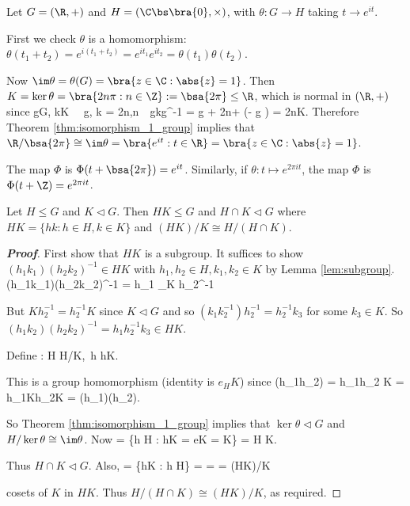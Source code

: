 \begin{example}
Let $G = (\R,+)$ and $H = (\C\bs\bra{0},\times)$, with $\theta:G\to H$ taking $t\to e^{i t}$.

First we check $\theta$ is a homomorphism: $\theta(t_1 + t_2) = e^{i(t_1+t_2)} = e^{it_1}e^{it_2} = \theta(t_1)\theta(t_2)$.

Now $\im \theta = \theta(G) = \bra{z\in \C:\abs{z}=1}$. Then $K = \ker\theta = \bra{2n\pi:n\in \Z}:= \bsa{2\pi}\leq \R$, which is normal in $(\R,+)$ since
\be
\forall g\in G, k\in K \ \ra \ g\in \R, k = 2n\pi,n\in \Z \ \ra \ gkg^{-1} = g + 2n\pi + (- g ) = 2n\pi \in K.
\ee
Therefore Theorem \ref{thm:isomorphism_1_group} implies that $\R/\bsa{2\pi} \cong \im \theta = \bra{e^{it}:t\in \R} = \bra{z\in \C:\abs{z}=1}$.

The map $\Phi$ is $\Phi(t+\bsa{2\pi}) = e^{it}$. Similarly, if $\theta:t\mapsto e^{2\pi it}$, the map $\Phi$ is $\Phi(t + \Z) = e^{2\pi it}$.
\end{example}



\begin{theorem}\label{thm:isomorphism_2_group}
Let $H \leq G$ and $K \lhd G$. Then $HK \leq G$ and $H \cap K \lhd G$ where $HK = \{hk : h \in H, k \in K\}$ and $(HK)/K \cong H/(H \cap K)$.
\end{theorem}

\begin{proof}[\bf Proof]
First show that $HK$ is a subgroup. It suffices to show $(h_1k_1)(h_2k_2)^{-1} \in HK$ with $h_1,h_2\in H, k_1,k_2 \in K$ by Lemma \ref{lem:subgroup}.
\be
(h_1k_1)(h_2k_2)^{-1} = h_1 _{\in K} h_2^{-1}
\ee

But $Kh^{-1}_2 = h^{-1}_2 K$ since $K \lhd G$ and so $(k_1k_2^{-1})h_2^{-1} = h_2^{-1} k_3$ for some $k_3 \in K$. So $(h_1k_2)(h_2k_2)^{-1} = h_1h_2^{-1} k_3 \in HK$.

Define
\be
\theta : H \to H/K,\ h \mapsto hK.
\ee

This is a group homomorphism (identity is $e_HK$) since
\be
\theta(h_1h_2) = h_1h_2 K = h_1Kh_2K = \theta(h_1)\theta(h_2).
\ee

So Theorem \ref{thm:isomorphism_1_group} implies that $\ker \theta \lhd G$ and $H/\ker \theta \cong \im \theta$. Now
\be
\ker \theta = \{h \in H : hK = eK = K\} = H \cap K.
\ee

Thus $H \cap K \lhd G$. Also,
\be
\im \theta = \{hK : h \in H\} =  =  = (HK)/K\ 
\ee

cosets of $K$ in $HK$. Thus $H/(H \cap K) \cong (HK)/K$, as required.
\end{proof}





